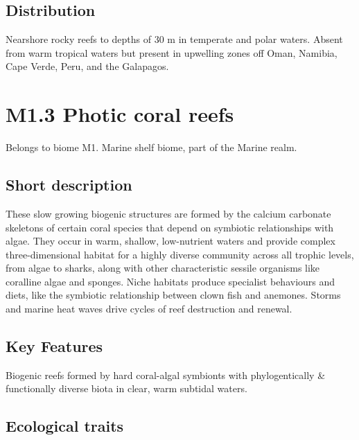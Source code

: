 \documentclass[
  letterpaper,
  DIV=11,
  numbers=noendperiod]{scrartcl}
\begin{document}
\subsection{Distribution}\label{distribution-27}

Nearshore rocky reefs to depths of 30 m in temperate and polar waters.
Absent from warm tropical waters but present in upwelling zones off
Oman, Namibia, Cape Verde, Peru, and the Galapagos.

\section{M1.3 Photic coral reefs}\label{m1.3-photic-coral-reefs}

Belongs to biome M1. Marine shelf biome, part of the Marine realm.

\subsection{Short description}\label{short-description-28}

These slow growing biogenic structures are formed by the calcium
carbonate skeletons of certain coral species that depend on symbiotic
relationships with algae. They occur in warm, shallow, low-nutrient
waters and provide complex three-dimensional habitat for a highly
diverse community across all trophic levels, from algae to sharks, along
with other characteristic sessile organisms like coralline algae and
sponges. Niche habitats produce specialist behaviours and diets, like
the symbiotic relationship between clown fish and anemones. Storms and
marine heat waves drive cycles of reef destruction and renewal.

\subsection{Key Features}\label{key-features-28}

Biogenic reefs formed by hard coral-algal symbionts with phylogentically
\& functionally diverse biota in clear, warm subtidal waters.

\subsection{Ecological traits}\label{ecological-traits-28}
\end{document}
